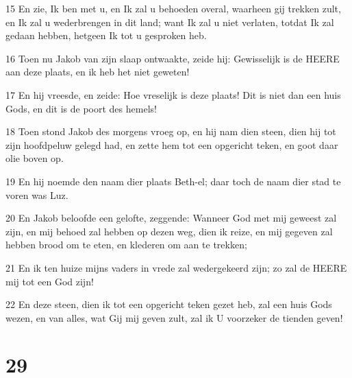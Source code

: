 \par 15 En zie, Ik ben met u, en Ik zal u behoeden overal, waarheen gij trekken zult, en Ik zal u wederbrengen in dit land; want Ik zal u niet verlaten, totdat Ik zal gedaan hebben, hetgeen Ik tot u gesproken heb.
\par 16 Toen nu Jakob van zijn slaap ontwaakte, zeide hij: Gewisselijk is de HEERE aan deze plaats, en ik heb het niet geweten!
\par 17 En hij vreesde, en zeide: Hoe vreselijk is deze plaats! Dit is niet dan een huis Gods, en dit is de poort des hemels!
\par 18 Toen stond Jakob des morgens vroeg op, en hij nam dien steen, dien hij tot zijn hoofdpeluw gelegd had, en zette hem tot een opgericht teken, en goot daar olie boven op.
\par 19 En hij noemde den naam dier plaats Beth-el; daar toch de naam dier stad te voren was Luz.
\par 20 En Jakob beloofde een gelofte, zeggende: Wanneer God met mij geweest zal zijn, en mij behoed zal hebben op dezen weg, dien ik reize, en mij gegeven zal hebben brood om te eten, en klederen om aan te trekken;
\par 21 En ik ten huize mijns vaders in vrede zal wedergekeerd zijn; zo zal de HEERE mij tot een God zijn!
\par 22 En deze steen, dien ik tot een opgericht teken gezet heb, zal een huis Gods wezen, en van alles, wat Gij mij geven zult, zal ik U voorzeker de tienden geven!

\chapter{29}

